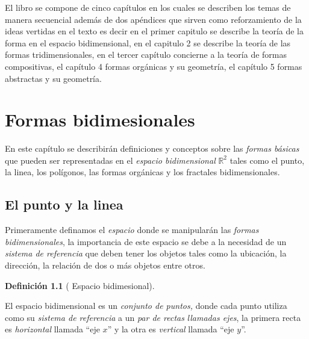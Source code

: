 \documentclass[
  16pt,
]{krantz}
\theoremstyle{definition}
\newtheorem{definition}{Definición}[chapter]
\theoremstyle{definition}
\theoremstyle{definition}
\theoremstyle{definition}
\theoremstyle{remark}
\begin{document}
El libro se compone de cinco capítulos en los cuales se describen los temas de manera secuencial además de dos apéndices que sirven como reforzamiento de la ideas vertidas en el texto es decir en el primer capitulo se describe la teoría de la forma en el espacio bidimensional, en el capitulo 2 se describe la teoría de las formas tridimensionales, en el tercer capítulo concierne a la teoría de formas compositivas, el capítulo 4 formas orgánicas y su geometría, el capítulo 5 formas abstractas y su geometría.

\mainmatter

\hypertarget{formas-bidimesionales}{%
\chapter{Formas bidimesionales}\label{formas-bidimesionales}}

En este capítulo se describirán definiciones y conceptos sobre las \emph{formas básicas} que pueden ser representadas en el \emph{espacio bidimensional}  \(\mathbb{R}^2\) tales como el punto, la linea, los polígonos, las formas orgánicas y los fractales bidimensionales.

\hypertarget{el-punto-y-la-linea}{%
\section{El punto y la linea}\label{el-punto-y-la-linea}}

Primeramente definamos el \emph{espacio} donde se manipularán las \emph{formas bidimensionales}, la importancia de este espacio se debe a la necesidad de un \emph{sistema de referencia} que deben tener los objetos tales como la ubicación, la dirección, la relación de dos o más objetos entre otros.

\begin{definition}[ Espacio bidimesional]
\protect\hypertarget{def:r2}{}{\label{def:r2} {} }
\end{definition}

El espacio bidimensional  es un \emph{conjunto de puntos,}  donde cada punto utiliza como su \emph{sistema de referencia} a un \emph{par de rectas} \emph{llamadas ejes}, la primera recta es \emph{horizontal}  llamada ``eje \(x\)'' y la otra es \emph{vertical}  llamada ``eje \(y\)''.
\end{document}
